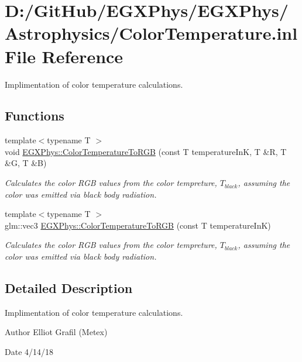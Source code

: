 \hypertarget{_color_temperature_8inl}{}\section{D\+:/\+Git\+Hub/\+E\+G\+X\+Phys/\+E\+G\+X\+Phys/\+Astrophysics/\+Color\+Temperature.inl File Reference}
\label{_color_temperature_8inl}


Implimentation of color temperature calculations.  


\subsection*{Functions}
\begin{DoxyCompactItemize}
\item 
{\footnotesize template$<$typename T $>$ }\\void \mbox{\hyperlink{group___e_g_x_phys-_astrophysics-_color_temperature_ga81db6b5b397c9f788001be73adae032d}{E\+G\+X\+Phys\+::\+Color\+Temperature\+To\+R\+GB}} (const T temperature\+InK, T \&R, T \&G, T \&B)
\begin{DoxyCompactList}\small\item\em Calculates the color R\+GB values from the color tempreture, $T_{black}$, assuming the color was emitted via black body radiation. \end{DoxyCompactList}\item 
{\footnotesize template$<$typename T $>$ }\\glm\+::vec3 \mbox{\hyperlink{group___e_g_x_phys-_astrophysics-_color_temperature_gaad787485a232976da96c2c785ce21dad}{E\+G\+X\+Phys\+::\+Color\+Temperature\+To\+R\+GB}} (const T temperature\+InK)
\begin{DoxyCompactList}\small\item\em Calculates the color R\+GB values from the color tempreture, $T_{black}$, assuming the color was emitted via black body radiation. \end{DoxyCompactList}\end{DoxyCompactItemize}


\subsection{Detailed Description}
Implimentation of color temperature calculations. 

\begin{DoxyAuthor}{Author}
Elliot Grafil (Metex) 
\end{DoxyAuthor}
\begin{DoxyDate}{Date}
4/14/18 
\end{DoxyDate}
